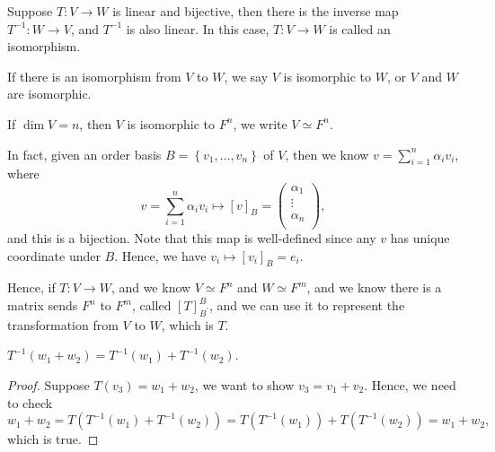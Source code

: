 \begin{theorem}
    Suppose \(T: V \to  W\) is linear and bijective, then there is the inverse map \(T^{-1}: W \to  V\), and \(T^{-1} \) is also linear. In this case, \(T: V \to  W\) is called an isomorphism.    
\end{theorem}
\begin{remark}
    If there is an isomorphism from \(V\) to \(W\), we say \(V\) is isomorphic to \(W\), or \(V\) and \(W\) are isomorphic.      
\end{remark}

\begin{eg}[Coordinates]
    If \(\dim V = n\), then \(V\) is isomorphic to \(F^n\), we write \(V \simeq F^n\).   
\end{eg}
\begin{explanation}
    In fact, given an order basis \(B = \left\{ v_1, \dots , v_n \right\} \) of \(V\), then we know \(v = \sum_{i=1}^n \alpha _i v_i \), where
    \[
        v = \sum_{i=1}^n \alpha _i v_i \mapsto [v]_B = \begin{pmatrix}
             \alpha _1 \\
             \vdots \\
              \alpha _n \\
        \end{pmatrix}, 
    \]   and this is a bijection. Note that this map is well-defined since any \(v\) has unique coordinate under \(B\).  Hence, we have \(v_i \mapsto [v_i]_B = e_i\).  
\end{explanation}

Hence, if \(T: V \to W\), and we know \(V \simeq F^n\) and \(W \simeq F^m\), and we know there is a matrix sends \(F^n\) to \(F^m\), called \([T]_{B^{\prime} }^B\), and we can use it to represent the transformation from \(V\) to \(W\), which is \(T\).

\begin{exercise}
    \(T^{-1}(w_1 + w_2) = T^{-1}(w_1) + T^{-1}(w_2)\). 
\end{exercise}
\begin{proof}
    Suppose \(T(v_3) = w_1 + w_2\), we want to show \(v_3 = v_1 + v_2\). Hence, we need to check 
    \[
        w_1 + w_2 = T \left( T^{-1}(w_1) + T^{-1}(w_2) \right) = T \left( T^{-1}(w_1) \right) + T \left( T^{-1}(w_2)  \right) = w_1 + w_2, 
    \] which is true.
\end{proof}